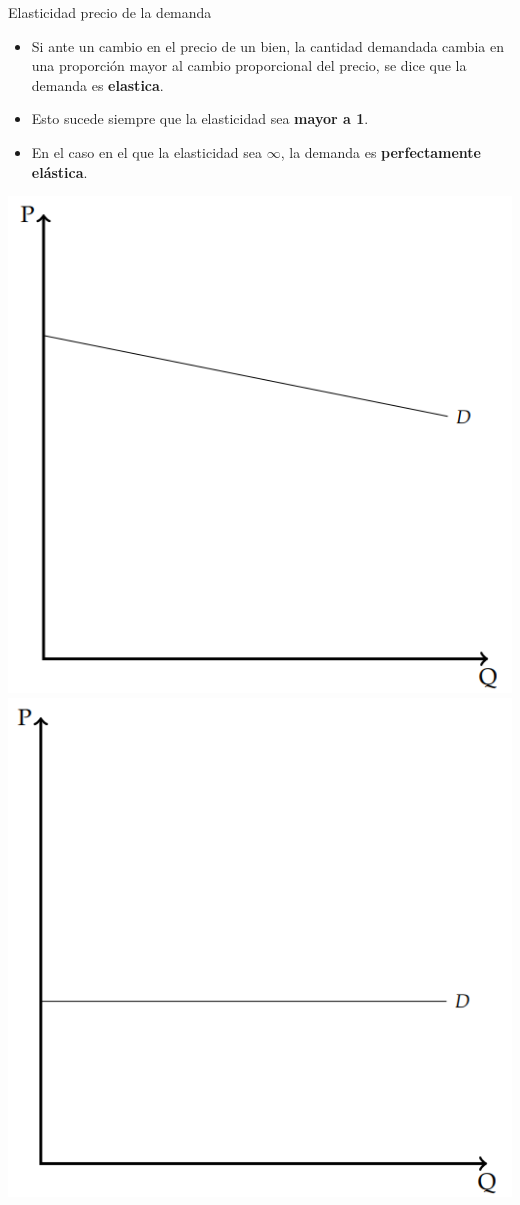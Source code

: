 \documentclass{beamer}
\begin{document}
\begin{frame}{Elasticidad precio de la demanda}
  \begin{itemize}
    \item Si ante un cambio en el precio de un bien, la cantidad
    demandada cambia en una proporción mayor al cambio proporcional
    del precio, se dice que la demanda es \textbf{elastica}.
    \item Esto sucede siempre que la elasticidad sea \textbf{mayor a 1}.
    \item En el caso en el que la elasticidad sea $\infty$, la demanda es \textbf{perfectamente elástica}.
  \end{itemize}
  \centering
  \includegraphics[scale=0.4]{../Figures/C16.3.png}
  \includegraphics[scale=0.4]{../Figures/C16.5.png}
\end{frame}
\end{document}
